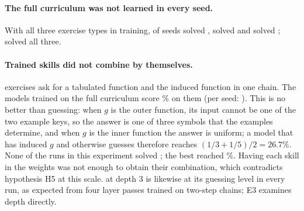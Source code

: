 \paragraph{The full curriculum was not learned in every seed.}
With all three exercise types in training, \ETwoFullFollowSolved{} of \ETwoFullSeeds{} seeds solved , \ETwoFullComposeTwoSolved{} solved  and \ETwoFullInduceSolved{} solved ; \ETwoFullAllSolved{} solved all three.


\paragraph{Trained skills did not combine by themselves.}
 exercises ask for a tabulated function and the induced function in one chain.
The models trained on the full curriculum score \ETwoFullMixedTwo\% on them (per seed: \ETwoFullMixedTwoList).
This is no better than guessing: when $g$ is the outer function, its input cannot be one of the two example keys, so the answer is one of three symbols that the examples determine, and when $g$ is the inner function the answer is uniform; a model that has induced $g$ and otherwise guesses therefore reaches $(1/3 + 1/5)/2 = 26.7\%$.
None of the \ETwoRunsAll{} runs in this experiment solved ; the best reached \ETwoMixedMax\%.
Having each skill in the weights was not enough to obtain their combination, which contradicts hypothesis H5 at this scale.
 at depth 3 is likewise at its guessing level in every run, as expected from four layer passes trained on two-step chains; E3 examines depth directly.
